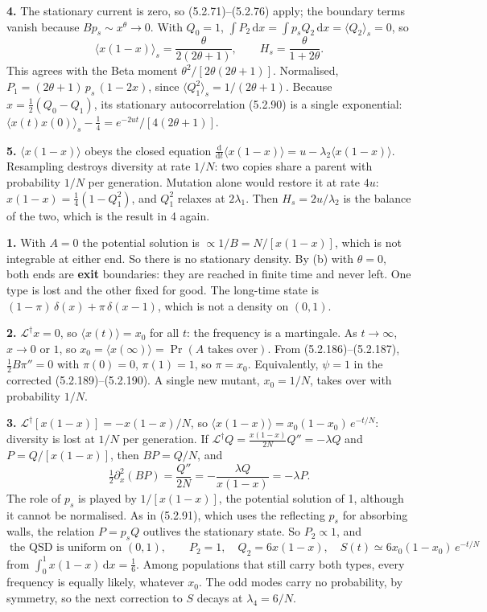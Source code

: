 \documentclass[11pt]{article}
\newcommand{\dd}{\mathrm{d}}
\newcommand{\avg}[1]{\langle #1\rangle}
\newcommand{\exsec}[1]{\par\vspace{6pt}{\sffamily\bfseries\large\color{PineGreen}#1}\par\vspace{-2pt}}
\begin{document}
\textbf{4.} The stationary current is zero, so (5.2.71)--(5.2.76) apply; the boundary terms vanish because
$Bp_s\sim x^\theta\to0$. With $Q_0=1$, $\int P_2\,\dd x=\int p_sQ_2\,\dd x=\avg{Q_2}_s=0$, so
\[ \avg{x(1-x)}_s=\frac\theta{2(2\theta+1)},\qquad H_s=\frac\theta{1+2\theta}. \]
This agrees with the Beta moment $\theta^2/[2\theta(2\theta+1)]$. Normalised, $P_1=(2\theta+1)\,p_s\,(1-2x)$, since
$\avg{Q_1^2}_s=1/(2\theta+1)$. Because $x=\frac12(Q_0-Q_1)$, its stationary autocorrelation (5.2.90) is a single
exponential: $\avg{x(t)x(0)}_s-\frac14=e^{-2ut}/[4(2\theta+1)]$.

\textbf{5.} $\avg{x(1-x)}$ obeys the closed equation $\frac{\dd}{\dd t}\avg{x(1-x)}=u-\lambda_2\avg{x(1-x)}$.
Resampling destroys diversity at rate $1/N$: two copies share a parent with probability $1/N$ per generation. Mutation
alone would restore it at rate $4u$: $x(1-x)=\frac14(1-Q_1^2)$, and $Q_1^2$ relaxes at $2\lambda_1$. Then
$H_s=2u/\lambda_2$ is the balance of the two, which is the result in 4 again.

\exsec{(d) Switch off mutation}
\textbf{1.} With $A=0$ the potential solution is $\propto1/B=N/[x(1-x)]$, which is not integrable at either end. So
there is no stationary density. By (b) with $\theta=0$, both ends are \textbf{exit} boundaries: they are reached in
finite time and never left. One type is lost and the other fixed for good. The long-time state is
$(1-\pi)\,\delta(x)+\pi\,\delta(x-1)$, which is not a density on $(0,1)$.

\textbf{2.} $\mathcal L^\dagger x=0$, so $\avg{x(t)}=x_0$ for all $t$: the frequency is a martingale. As
$t\to\infty$, $x\to0$ or $1$, so $x_0=\avg{x(\infty)}=\Pr(A\text{ takes over})$. From (5.2.186)--(5.2.187),
$\frac12B\pi''=0$ with $\pi(0)=0$, $\pi(1)=1$, so $\pi=x_0$. Equivalently, $\psi=1$ in the corrected
(5.2.189)--(5.2.190). A single new mutant, $x_0=1/N$, takes over with probability $1/N$.

\textbf{3.} $\mathcal L^\dagger[x(1-x)]=-x(1-x)/N$, so $\avg{x(1-x)}=x_0(1-x_0)\,e^{-t/N}$: diversity is lost at
$1/N$ per generation. If $\mathcal L^\dagger Q=\frac{x(1-x)}{2N}Q''=-\lambda Q$ and $P=Q/[x(1-x)]$, then
$BP=Q/N$, and
\[ \tfrac12\partial_x^2(BP)=\frac{Q''}{2N}=-\frac{\lambda Q}{x(1-x)}=-\lambda P. \]
The role of $p_s$ is played by $1/[x(1-x)]$, the potential solution of 1, although it cannot be normalised. As in
(5.2.91), which uses the reflecting $p_s$ for absorbing walls, the relation $P=p_sQ$ outlives the stationary state.
So $P_2\propto1$, and
\[ \boxed{\;\text{the QSD is uniform on }(0,1),\qquad P_2=1,\quad Q_2=6x(1-x),\quad
   S(t)\simeq6x_0(1-x_0)\,e^{-t/N}\;} \]
from $\int_0^1x(1-x)\,\dd x=\frac16$. Among populations that still carry both types, every frequency is equally
likely, whatever $x_0$. The odd modes carry no probability, by symmetry, so the next correction to $S$ decays at
$\lambda_4=6/N$.
\end{document}
